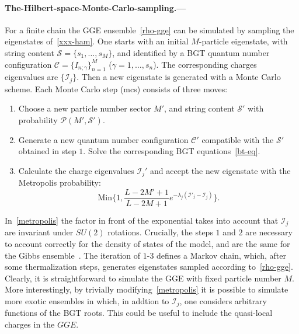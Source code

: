 \documentclass[twocolumn,superscriptaddress,prb,10pt]{revtex4-1}
\begin{document}
\paragraph*{The-Hilbert-space-Monte-Carlo-sampling.---}


For a finite chain the GGE ensemble~\eqref{rho-gge} can be simulated by sampling the 
eigenstates of~\eqref{xxx-ham}. One starts with an initial $M$-particle 
eigenstate, with string content ${\mathcal S}=\{s_1,\dots,s_M\}$, and identified by a 
BGT quantum number configuration ${\mathcal C}=\{I_{n;\gamma}\}_{n=1}^M$ ($\gamma=1,
\dots,s_n$). The corresponding charges eigenvalues are $\{{\mathcal I_j}\}$. 
Then a new eigenstate is generated with a Monte Carlo scheme. 
Each Monte Carlo step (mcs) consists of three moves:
%
\begin{enumerate}
\item Choose a new particle number sector $M'$, and string content ${\mathcal S}'$ 
 with probability ${\mathcal P}(M',{\mathcal S}')$.
\item Generate a new quantum number configuration ${\mathcal C}'$ compatible with 
 the ${\mathcal  S}'$ obtained in step $1$. Solve the corresponding BGT 
 equations~\eqref{bt-eq}. 
\item Calculate the charge eigenvalues ${\mathcal I}_j'$ and accept the new 
eigenstate with the Metropolis probability:
%
\begin{equation}
\label{metropolis}
\textrm{Min}\Big\{1,\frac{L-2M'+1}{L-2M+1}e^{-\lambda_j({\mathcal I}'_j-
{\mathcal I}^{}_j)}\Big\}.
\end{equation}
%
\end{enumerate}
%
In~\eqref{metropolis} the factor in front of the exponential takes into account 
that ${\mathcal I}_j$ are invariant under $SU(2)$ rotations. Crucially, the steps 
$1$ and $2$ are necessary to account correctly for the density of states of the model, and 
are the same for the Gibbs ensemble~\cite{gu-2005}. The iteration of $1$-$3$ defines a Markov 
chain, which, after some thermalization steps, generates eigenstates sampled according 
to~\eqref{rho-gge}. Clearly, it is straightforward to simulate the GGE with fixed particle 
number $M$. More interestingly, by trivially modifying~\eqref{metropolis} it is possible to 
simulate more exotic ensembles in which, in addtion to ${\mathcal I}_j$, one considers 
arbitrary functions of the BGT roots. This could be useful to include the quasi-local 
charges in the $GGE$. 
\end{document}
